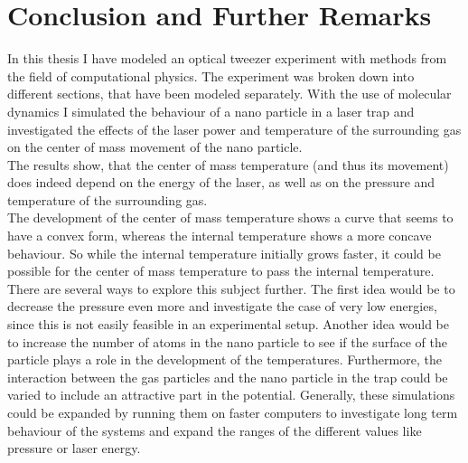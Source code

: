 \documentclass[12pt]{article}
\begin{document}
\newpage
\section{Conclusion and Further Remarks}
In this thesis I have modeled an optical tweezer experiment with methods from the field of computational physics. The experiment was broken down into
different sections, that have been modeled separately. With the use of molecular dynamics I simulated the behaviour of a nano particle in a laser trap
and investigated the effects of the laser power and temperature of the surrounding gas on the center of mass movement of the nano particle.\\
The results show, that the center of mass temperature (and thus its movement) does indeed depend on the energy of the laser, as well as on the
pressure and temperature of the surrounding gas.\\
The development of the center of mass temperature shows a curve that seems to have a convex form, whereas the internal temperature shows a more
concave behaviour. So while the internal temperature initially grows faster, it could be possible for the center of mass temperature to pass the
internal temperature.\\
There are several ways to explore this subject further. The first idea would be to decrease the pressure even more and investigate the case of very low
energies, since this is not easily feasible in an experimental setup. Another idea would be to increase the number of atoms in the nano particle to
see if the surface of the particle plays a role in the development of the temperatures. Furthermore, the interaction between the gas particles and the
nano particle in the trap could be varied to include an attractive part in the potential. Generally, these simulations could be expanded by running
them on faster computers to investigate long term behaviour of the systems and expand the ranges of the different values like pressure or laser
energy. 




\newpage


\end{document}
